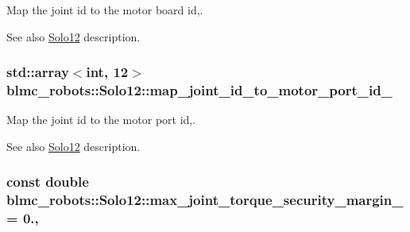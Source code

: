 Map the joint id to the motor board id,. 

\begin{DoxySeeAlso}{See also}
\hyperlink{classblmc__robots_1_1Solo12}{Solo12} description. 
\end{DoxySeeAlso}
\subsubsection[{\texorpdfstring{map\+\_\+joint\+\_\+id\+\_\+to\+\_\+motor\+\_\+port\+\_\+id\+\_\+}{map_joint_id_to_motor_port_id_}}]{\setlength{\rightskip}{0pt plus 5cm}std\+::array$<$int, 12$>$ blmc\+\_\+robots\+::\+Solo12\+::map\+\_\+joint\+\_\+id\+\_\+to\+\_\+motor\+\_\+port\+\_\+id\+\_\+\hspace{0.3cm}{\ttfamily [private]}}\hypertarget{classblmc__robots_1_1Solo12_adc6fc34d0685db1e9a6094474d1db903}{}\label{classblmc__robots_1_1Solo12_adc6fc34d0685db1e9a6094474d1db903}


Map the joint id to the motor port id,. 

\begin{DoxySeeAlso}{See also}
\hyperlink{classblmc__robots_1_1Solo12}{Solo12} description. 
\end{DoxySeeAlso}
\subsubsection[{\texorpdfstring{max\+\_\+joint\+\_\+torque\+\_\+security\+\_\+margin\+\_\+}{max_joint_torque_security_margin_}}]{\setlength{\rightskip}{0pt plus 5cm}const double blmc\+\_\+robots\+::\+Solo12\+::max\+\_\+joint\+\_\+torque\+\_\+security\+\_\+margin\+\_\+ = 0.\hspace{0.3cm}{\ttfamily [static]}, {\ttfamily [private]}}\hypertarget{classblmc__robots_1_1Solo12_a7e83448a46ffc61cc70e4b82883ee113}{}\label{classblmc__robots_1_1Solo12_a7e83448a46ffc61cc70e4b82883ee113}


